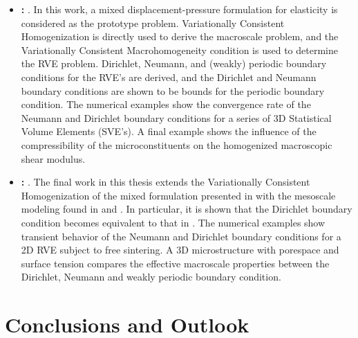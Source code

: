 \documentclass[ExampleMasters.tex]{subfiles}
\begin{document}
\begin{itemize}
 \item \textbf{: }.
In this work, a mixed displacement-pressure formulation for elasticity is considered as the prototype problem.
Variationally Consistent Homogenization is directly used to derive the macroscale problem, and the Variationally Consistent Macrohomogeneity condition is used to determine the RVE problem.
Dirichlet, Neumann, and (weakly) periodic boundary conditions for the RVE's are derived, and the Dirichlet and Neumann boundary conditions are shown to be bounds for the periodic boundary condition.
The numerical examples show the convergence rate of the Neumann and Dirichlet boundary conditions for a series of 3D Statistical Volume Elements (SVE's).
A final example shows the influence of the compressibility of the microconstituents on the homogenized macroscopic shear modulus.

 \item \textbf{: }.
The final work in this thesis extends the Variationally Consistent Homogenization of the mixed formulation presented in  with the mesoscale modeling found in  and .
In particular, it is shown that the Dirichlet boundary condition becomes equivalent to that in .
The numerical examples show transient behavior of the Neumann and Dirichlet boundary conditions for a 2D RVE subject to free sintering.
A 3D microstructure with porespace and surface tension compares the effective macroscale properties between the Dirichlet, Neumann and weakly periodic boundary condition.


\end{itemize}

\chapter{Conclusions and Outlook}
\end{document}
